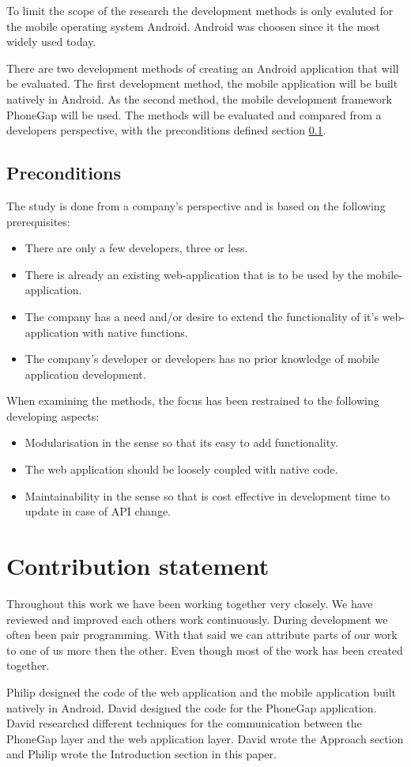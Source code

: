 To limit the scope of the research the development methods is only evaluted for the mobile operating system Android. Android was choosen since it the most widely used today. 

There are two development methods of creating an Android application that will be evaluated. The first development method, the mobile application will be built natively in Android. As the second method, the mobile development framework PhoneGap will be used. The methods will be evaluated and compared from a developers perspective, with the preconditions defined section \ref{section-preconditions}.

\subsection{Preconditions} \label{section-preconditions}
The study is done from a company's perspective and is based on the following prerequisites:
\begin{itemize}
\item There are only a few developers, three or less.
\item There is already an existing web-application that is to be used by the mobile-application.
\item The company has a need and/or desire to extend the functionality of it's web-application with native functions.
\item The company's developer or developers has no prior knowledge of mobile application development.
\end{itemize}

When examining the methods, the focus has been restrained to the following developing aspects:
\begin{itemize}
\item Modularisation in the sense so that its easy to add functionality.
\item The web application should be loosely coupled with native code.
\item Maintainability in the sense so that is cost effective in development time to update in case of API change.
\end{itemize}
\section{Contribution statement}
Throughout this work we have been working together very closely. We have reviewed and improved each others work continuously. During development we often been pair programming. With that said we can attribute parts of our work to one of us more then the other. Even though most of the work has been created together. 

Philip designed the code of the web application and the mobile application built natively in Android. David designed the code for the PhoneGap application. David researched different techniques for the communication between the PhoneGap layer and the web application layer. David wrote the Approach section and Philip wrote the Introduction section in this paper. 

